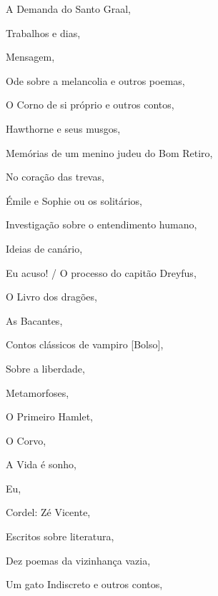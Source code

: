 \begin{multicols}{2}
\begin{enumerate}
{\item A Demanda do Santo Graal, {}
\item Trabalhos e dias, {}
\item Mensagem, {}
\item Ode sobre a melancolia e outros poemas, {}
\item O Corno de si próprio e outros contos, {}
\item Hawthorne e seus musgos, {}
\item Memórias de um menino judeu do Bom Retiro, {}
\item No coração das trevas, {}
\item Émile e Sophie ou os solitários, {}
\item Investigação sobre o entendimento humano, {}
\item Ideias de canário, {}
\item Eu acuso! / O processo do capitão Dreyfus, {}
\item O Livro dos dragões, {}
\item As Bacantes, {}
\item Contos clássicos de vampiro [Bolso], {}
\item Sobre a liberdade, {}
\item Metamorfoses, {}
\item O Primeiro Hamlet, {}
\item O Corvo, {}
\item A Vida é sonho, {}
\item Eu, {}
\item Cordel: Zé Vicente, {}
\item Escritos sobre literatura, {}
\item Dez poemas da vizinhança vazia, {}
\item Um gato Indiscreto e outros contos, {}
}
\end{enumerate}
\end{multicols}
